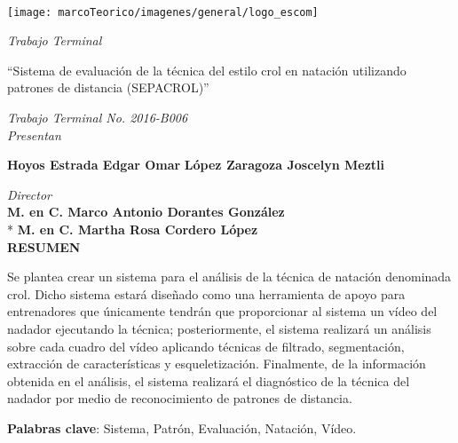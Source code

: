 \begin{minipage}[c][0.65\textheight][t]{0.2\textwidth}
\begin{center}
\hskip2pt
\vrule width2.5pt height17cm
        \hskip1mm
        \vrule width1pt height17cm \\
        \texttt{[image: marcoTeorico/imagenes/general/logo\_escom]}
        \end{center}

\end{minipage}
\begin{minipage}[c][0.6\textheight][t]{0.65\textwidth}
  \begin{center}
  	{\large \textit{Trabajo Terminal}}
    \\
     \vspace{.01cm}
    \end{center}
    {\large{ ``Sistema de evaluación de la técnica del estilo crol en natación utilizando patrones de distancia (SEPACROL)''} }%
    \\
    \vspace{.01cm}
	\begin{center}
    {\large \textit{Trabajo Terminal No. 2016-B006}} %
    \\
    \vspace{.5cm}
    {\large \textit{Presentan}}

    \begin{center} %
		 \textbf{Hoyos Estrada Edgar Omar} \linebreak
        \textbf{López Zaragoza Joscelyn Meztli} \linebreak
       
    \end{center}

    \vspace{0.3cm}

   {\large \textit{Director}}
   \\
    \textbf{{M. en C. Marco Antonio Dorantes González}}\\*
    \textbf{{M. en C. Martha Rosa Cordero López}}
    \vspace{0.5cm}
	 \\
    {\textbf{RESUMEN}}
    \end{center}
Se plantea crear un sistema para el análisis de la técnica de natación denominada crol. Dicho sistema estará diseñado como una 
    herramienta de apoyo para entrenadores que únicamente tendrán que proporcionar al sistema un vídeo del
    nadador ejecutando la técnica; posteriormente, el sistema realizará un análisis sobre cada cuadro del vídeo aplicando técnicas
    de filtrado, segmentación, extracción de características y esqueletización. Finalmente, de la información obtenida en el análisis,
    el sistema realizará el diagnóstico de la técnica del nadador por medio de reconocimiento de patrones de distancia.
	 

\vspace{0.2cm}
\textbf{Palabras clave}: Sistema, Patrón, Evaluación, Natación, Vídeo.

\vspace{0.5cm}

\end{minipage}